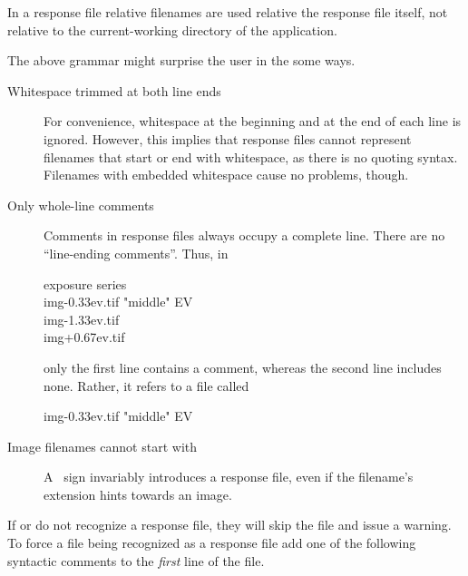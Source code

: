 In a response file relative filenames are used relative the response file itself, not relative
to the current-working directory of the application.

The above grammar might surprise the user in the some ways.

\begin{description}
\item[Whitespace trimmed at both line ends]\itemend
  For convenience, whitespace at the beginning and at the end of each line is ignored.  However,
  this implies that response files cannot represent filenames that start or end with whitespace,
  as there is no quoting syntax.  Filenames with embedded whitespace cause no problems, though.

\item[Only whole-line comments]\itemend
  Comments in response files always occupy a complete line.  There are no ``line-ending
  comments''.  Thus, in

  \begin{literal}
     exposure series \\
    img-0.33ev.tif  "middle" EV \\
    img-1.33ev.tif \\
    img+0.67ev.tif \\
  \end{literal}

  only the first line contains a comment, whereas the second line includes none.  Rather, it
  refers to a file called

  \begin{literal}
    img-0.33ev.tif  "middle" EV
  \end{literal}

\item[Image filenames cannot start with ]\itemend
  A ~sign invariably introduces a response file, even
  if the filename's extension hints towards an image.
\end{description}

%
If  or  do not recognize a response file, they will
skip the file and issue a warning.  To force a file being recognized as a response file add one
of the following syntactic comments to the \emph{first} line of the file.


